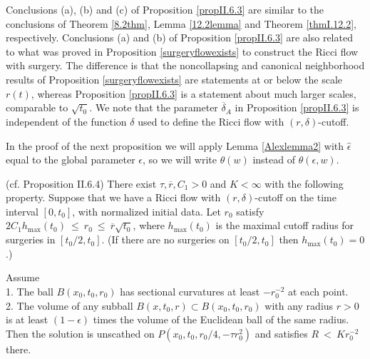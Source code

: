 Conclusions (a), (b) and (c) of Proposition \ref{propII.6.3}
are similar to the conclusions of Theorem \ref{8.2thm},
Lemma \ref{12.2lemma} and Theorem \ref{thmI.12.2}, respectively.
Conclusions (a) and (b) of Proposition \ref{propII.6.3}
are also related
to what was proved in Proposition \ref{surgeryflowexists} to construct the
Ricci flow with surgery. The difference
is that the noncollapsing and canonical neighborhood results of Proposition
\ref{surgeryflowexists}
are statements at or below the scale $r(t)$, whereas Proposition \ref{propII.6.3}
is a statement about much larger scales, comparable to $\sqrt{t_0}$.
We note that the parameter $\overline{\delta}_A$ in
Proposition \ref{propII.6.3} is independent of the function $\delta$
used to define the Ricci flow with $(r, \delta)$-cutoff.


In the proof of the next proposition we will apply Lemma \ref{Alexlemma2} with
$\widehat{\epsilon}$ equal to the global parameter $\epsilon$,
so we will write $\theta(w)$ instead of $\theta(\epsilon, w)$.


\begin{proposition}
  \label{prop:kl-proof-double-sided-curvature-bound-thick-part-modulo-two-propositions-existence-thick-thin-geometry}
 \label{propII.6.4}
(cf. Proposition II.6.4)
There exist $\tau, \overline{r}, C_1 > 0$ and $K < \infty$ with the
following property. Suppose that we have a Ricci flow with $(r, \delta)$-cutoff
on the time interval $[0, t_0]$, with normalized initial data.
  Let $r_0$ satisfy
$2C_1 h_{\max}(t_0) \: \le \: r_0 \: \le \: \overline{r} \sqrt{t_0}$,
where $h_{\max}(t_0)$ is the maximal cutoff radius for surgeries in
$[t_0/2, t_0]$. (If there are no surgeries on $[t_0/2, t_0]$ then
$h_{\max}(t_0) = 0$.)

Assume \\
1. The ball $B(x_0, t_0, r_0)$ has sectional curvatures at least $- r_0^{-2}$
at each point. \\
2. The volume of any subball $B(x, t_0, r) \subset B(x_0, t_0, r_0)$ with
any radius $r > 0$ is at least $(1-\epsilon)$ times the volume of the
Euclidean ball of the same radius.\\

Then the solution is unscathed on
$P(x_0, t_0, r_0/4, - \tau r_0^2)$
and satisfies $R \: < \: K r_0^{-2}$ there.
\end{proposition}


